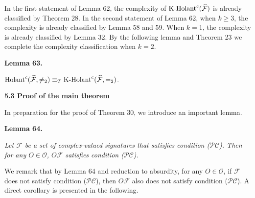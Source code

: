 \documentclass[10pt,a4paper]{article}
\begin{document}



In the first statement of Lemma 62, the complexity of $\textup{{K-Holant}}^{c}(\widehat{\mathcal{F}})$ is already classified by Theorem 28.
In the second statement of Lemma 62, when $k\geq 3$, the complexity is already classified by Lemma 58 and 59. When $k=1$, the complexity is already classified by Lemma 32. By the following lemma and Theorem 23 we complete the complexity classification when $k=2$.\par





\par\medskip\noindent\textbf{
\textbf{Lemma 63}\textbf{.}
}\par



$\textup{{Holant}}^{c}(\widehat{\mathcal{F}},\neq_{2})\equiv_{T}\textup{{K-Holant}}^{c}(\widehat{\mathcal{F}},=_{2})$\emph{.}\par







\par\medskip\noindent\textbf{
5.3 Proof of the main theorem}\par




In preparation for the proof of Theorem 30, we introduce an important lemma.\par





\par\medskip\noindent\textbf{
\textbf{Lemma 64}\textbf{.}
}\par



\emph{Let $\mathcal{F}$ be a set of complex-valued signatures that satisfies condition ($\mathcal{PC}$). Then for any $O\in\mathscr{O}$, $O\mathcal{F}$ satisfies condition ($\mathcal{PC}$).}\par






We remark that by Lemma 64 and reduction to absurdity, for any $O\in\mathscr{O}$, if $\mathcal{F}$ does not satisfy condition ($\mathcal{PC}$), then $O\mathcal{F}$ also does not satisfy condition ($\mathcal{PC}$). A direct corollary is presented in the following.\par
\end{document}
